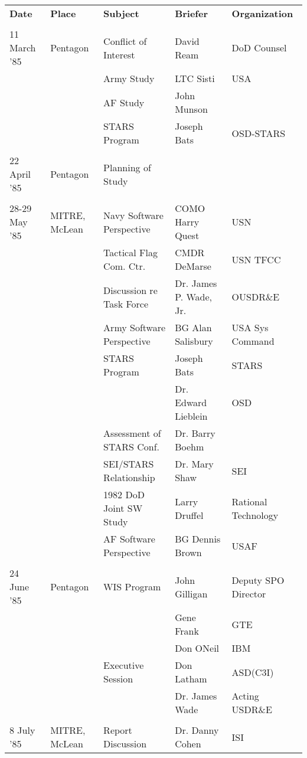 \documentclass[11pt,final]{article}
\begin{document}
\noindent
\begin{scriptsize}
\begin{tabular}{ l l l l l }
\textbf{Date} & \textbf{Place} & \textbf{Subject} & \textbf{Briefer} & \textbf{Organization}\\
\\
11 March ’85 & Pentagon & Conflict of Interest & David Ream & DoD Counsel\\
    & & Army Study    & LTC Sisti & USA \\
    & & AF Study      & John Munson & \\
    & & STARS Program & Joseph Bats & OSD-STARS \\
\\
    22 April ’85 & Pentagon & Planning of Study\\
\\
    28-29 May ’85 & MITRE, McLean & Navy Software Perspective         & COMO Harry Quest & USN\\
    & & Tactical Flag Com. Ctr.      & CMDR DeMarse     & USN TFCC\\
    & & Discussion re Task Force     & Dr. James P. Wade, Jr. &  OUSDR\&E\\
    & & Army Software Perspective    & BG Alan Salisbury     & USA Sys Command\\
    & & STARS Program                & Joseph Bats           & STARS\\
    & &                              & Dr. Edward Lieblein   & OSD\\
    & & Assessment of STARS Conf.    & Dr. Barry Boehm & \\
    & & SEI/STARS Relationship       & Dr. Mary Shaw& SEI \\
    & & 1982 DoD Joint SW Study      & Larry Druffel & Rational Technology\\
    & & AF Software Perspective      & BG Dennis Brown & USAF\\
\\
    24 June ’85 & Pentagon  & WIS Program & John Gilligan     & Deputy SPO Director\\
 & & & Gene Frank                    & GTE\\
 & & & Don ONeil                     & IBM\\
 & & Executive Session & Don Latham  & ASD(C3I)\\
 & & & Dr. James Wade                & Acting USDR\&E\\
\\
8 July ’85 & MITRE, McLean & Report Discussion & Dr. Danny Cohen & ISI\\

\end{tabular}
\end{scriptsize}
\end{document}
